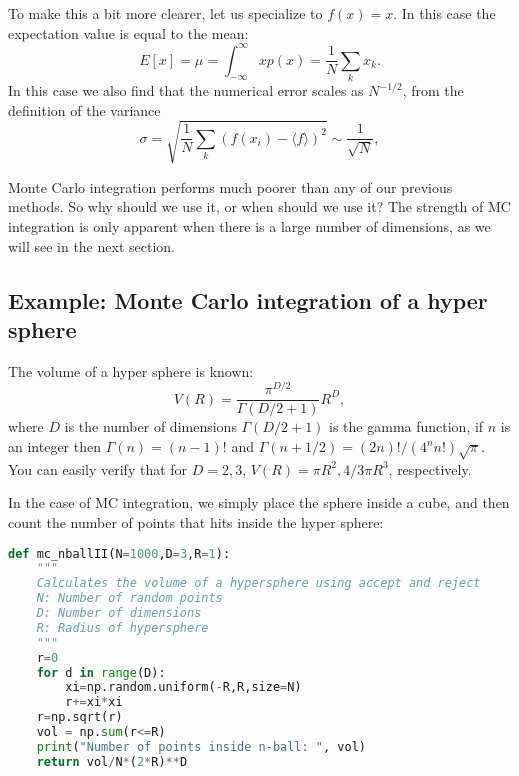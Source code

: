 \documentclass[graybox,sectrefs,envcountresetchap,open=right,final]{svmonodo}
\newenvironment{graybox2admon}[1][]{
\begin{graybox2mdframed}[frametitle=#1]
}
{
\end{graybox2mdframed}
}
\begin{document}
To make this a bit more clearer, let us specialize to $f(x)=x$. In
this case the expectation value is equal to the mean:
\begin{equation}
E[x]=\mu=\int_{-\infty}^\infty xp(x)=\frac{1}{N}\sum_kx_k.
\label{eq:mc:mean}
\end{equation}
In this case we also find that the numerical error scales as $N^{-1/2}$, from the definition of the variance
\begin{equation}
\sigma=\sqrt{\frac{1}{N}\sum_k(f(x_i)-\langle f\rangle)^2}\sim\frac{1}{\sqrt{N}},
\label{eq:mc:varf}
\end{equation}


\begin{graybox2admon}[Why would we or anyone use MC integration?]
Monte Carlo integration performs much poorer than any of our previous
methods. So why should we use it, or when should we use it? The
strength of MC integration is only apparent when there is a large
number of dimensions, as we will see in the next section.
\end{graybox2admon}




\subsection{Example: Monte Carlo integration of a hyper sphere}
The volume of a hyper sphere is known:
\begin{equation}
V(R)=\frac{\pi^{D/2}}{\Gamma(D/2+1)}R^D,
\label{eq:mc:hyp}
\end{equation}
where $D$ is the number of dimensions $\Gamma(D/2+1)$ is the gamma
function, if $n$ is an integer then $\Gamma(n)=(n-1)!$ and
$\Gamma(n+1/2)=(2n)!/(4^nn!)\sqrt{\pi}$. You can easily verify that
for $D=2,3$, $V(R)=\pi R^2, 4/3\pi R^3$, respectively.

In the case of MC integration, we simply place the sphere inside a cube, and then count
the number of points that hits inside the hyper sphere:

















\begin{lstlisting}[language=python,style=blue1]
def mc_nballII(N=1000,D=3,R=1):
    """
    Calculates the volume of a hypersphere using accept and reject
    N: Number of random points
    D: Number of dimensions
    R: Radius of hypersphere
    """
    r=0
    for d in range(D):
        xi=np.random.uniform(-R,R,size=N)
        r+=xi*xi
    r=np.sqrt(r)
    vol = np.sum(r<=R)
    print("Number of points inside n-ball: ", vol)
    return vol/N*(2*R)**D

\end{lstlisting}
\end{document}
